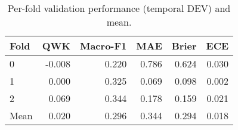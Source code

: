 \begin{table}
\caption{Per-fold validation performance (temporal DEV) and mean.}
\label{tab:cv-performance}
\begin{tabular}{lrrrrr}
\toprule
Fold & QWK & Macro-F1 & MAE & Brier & ECE \\
\midrule
0 & -0.008 & 0.220 & 0.786 & 0.624 & 0.030 \\
1 & 0.000 & 0.325 & 0.069 & 0.098 & 0.002 \\
2 & 0.069 & 0.344 & 0.178 & 0.159 & 0.021 \\
Mean & 0.020 & 0.296 & 0.344 & 0.294 & 0.018 \\
\bottomrule
\end{tabular}
\end{table}
